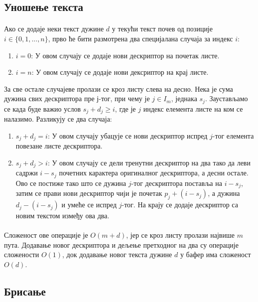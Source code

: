 \documentclass[12pt,oneside]{memoir}
\begin{document}
\subsection{Уношење текста}
\paragraph{}
Ако се додаје неки текст дужине \(d\) у текући текст почев од позиције
\(i \in \{0,1,...,n\}\), прво ће бити размотрена два специјалана случаја за индекс \(i\):

\begin{enumerate}
	\item \(i=0\): У овом случају се додаје нови дескриптор на почетак листе.
	\item \(i=n\): У овом случају се додаје нови дексриптор на крај листе.
\end{enumerate}

За све остале случајеве пролази се кроз листу слева на десно. Нека је сума дужина свих дескриптора
пре \(ј\)-тог, при чему је \(j \in I_m\), једнака \(s_j\). Заустављамо се 
када буде важио услов \(s_j + d_j \geq i\), где је \(j\) индекс елемента листе на ком
се налазимо. Разликују се два случаја:

\begin{enumerate}
	\item \(s_j + d_j = i\): У овом случају убацује се нови дескриптор испред \(j\)-тог
	елемента повезане листе дескриптора.
	\item \(s_j + d_j > i\): У овом случају се дели тренутни дескриптор на два тако
	да леви садржи \(i - s_j\) почетних карактера оригиналног дескриптора, а десни остале.
	Ово се постиже тако што се дужина \(j\)-тог дескриптора поставља на \(i - s_j\), затим
	се прави нови дескриптор чији је почетак \(p_j + (i - s_j)\), а дужина \(d_j - (i - s_j)\)
	и умеће се испред \(j\)-тог. На крају се додаје дескриптор са новим текстом између ова
	два.
	
\end{enumerate}

\paragraph{}
Сложеност ове операције је \(O(m + d)\), јер се кроз листу пролази највише \(m\) пута.
Додавање новог дескриптора и дељење претходног на два су операције сложености \(O(1)\), док
додавање новог текста дужине \(d\) у бафер има сложеност \(O(d)\).

\subsection{Брисање}
\end{document}
